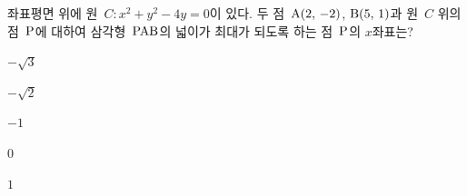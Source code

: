 좌표평면 위에 원~$C: x^2+y^2-4y=0$이 있다. 두 점~$\mathrm{A}(2,\mkern3mu -2)$, $\mathrm{B}(5,\mkern3mu 1)$과 원~$C$ 위의 점~$\mathrm{P}$에 대하여 삼각형~$\mathrm{PAB}$의 넓이가 최대가 되도록 하는 점~$\mathrm{P}$의 $x$좌표는?
\begin{choices32}{\rule[-3ex]{0pt}{8ex}$-\sqrt{3}$}{\rule[-3ex]{0pt}{8ex}$-\sqrt{2}$}{\rule[-3ex]{0pt}{8ex}$-1$}{\rule[-3ex]{0pt}{8ex}$0$}{\rule[-3ex]{0pt}{8ex}$1$}\end{choices32}
